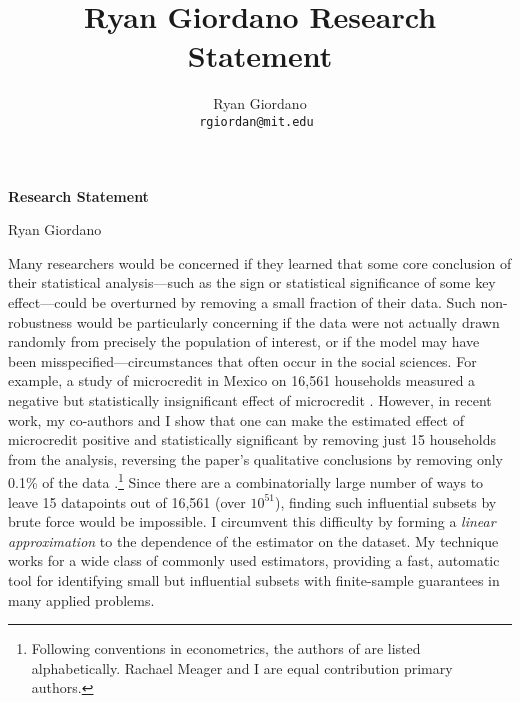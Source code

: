 
\usepackage{enumitem}

\usepackage{geometry}
\geometry{top=1.0in}
\geometry{left=1.1in}
\geometry{right=1.1in}

\title{Ryan Giordano Research Statement}

\author{
  Ryan Giordano \\ \texttt{rgiordan@mit.edu }
}



\begin{minipage}[t]{0.5\textwidth}
\hspace{-2em} %
{\bf \LARGE Research Statement}\\
\end{minipage}
\begin{minipage}[t]{0.5\textwidth}
        \hspace{8em} %
        {\LARGE Ryan Giordano}
\end{minipage}

Many researchers would be concerned if they learned that some core conclusion of
their statistical analysis---such as the sign or statistical significance of
some key effect---could be overturned by removing a small fraction of their
data. Such non-robustness would be particularly concerning if the data were not
actually drawn randomly from precisely the population of interest, or if the
model may have been misspecified---circumstances that often occur in the social
sciences. For example, a study of microcredit in Mexico on 16,561 households
measured a negative but statistically insignificant effect of microcredit
\citep{angelucci:2015:microcredit}.  However, in recent work, my co-authors and
I show that one can make the estimated effect of microcredit positive and
statistically significant by removing just 15 households from the analysis,
reversing the paper's qualitative conclusions by removing only 0.1\% of the data
\citep{giordano:2020:amip}.\footnote{Following conventions in econometrics, the
authors of \citet{giordano:2020:amip} are listed alphabetically.  Rachael Meager
and I are equal contribution primary authors.}  Since there are a
combinatorially large number of ways to leave 15 datapoints out of 16,561 (over
$10^{51}$), finding such influential subsets by brute force would be impossible.
I circumvent this difficulty by forming a \emph{linear approximation} to the
dependence of the estimator on the dataset. My technique works for a wide class
of commonly used estimators, providing a fast, automatic tool for identifying
small but influential subsets with finite-sample guarantees in many applied
problems.

